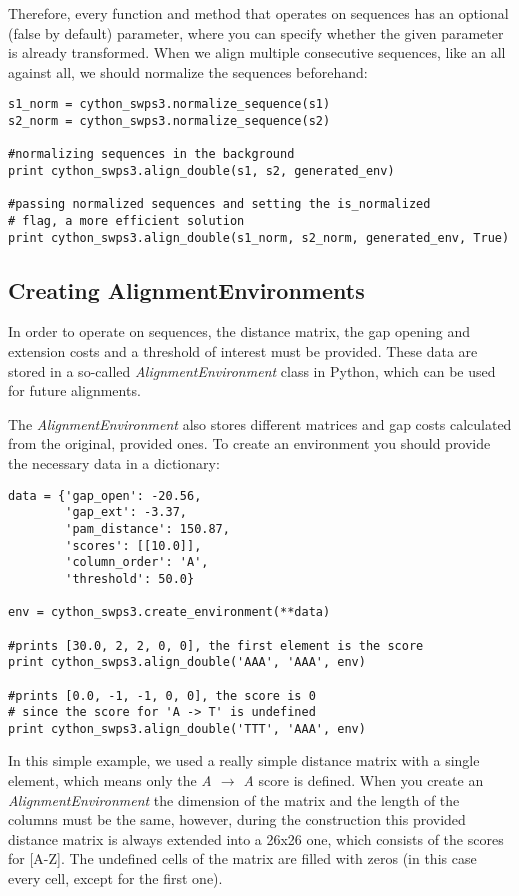 \documentclass[12pt]{article}
\newcommand{\alenv}{\emph{AlignmentEnvironment}}
\begin{document}
Therefore, every function and method that operates on sequences has an optional (false by default) parameter, where you can specify whether the given parameter is already transformed. When we align multiple consecutive sequences, like an all against all, we should normalize the sequences beforehand:

\begin{lstlisting}
s1_norm = cython_swps3.normalize_sequence(s1)
s2_norm = cython_swps3.normalize_sequence(s2)

#normalizing sequences in the background
print cython_swps3.align_double(s1, s2, generated_env)

#passing normalized sequences and setting the is_normalized
# flag, a more efficient solution
print cython_swps3.align_double(s1_norm, s2_norm, generated_env, True)
\end{lstlisting}


\subsection{Creating AlignmentEnvironments}
\label{subsec:createAlEnvs}
In order to operate on sequences, the distance matrix, the gap opening and extension costs and a threshold of interest must be provided. These data are stored in a so-called \alenv{} class in Python, which can be used for future alignments. 

The \alenv{} also stores different matrices and gap costs calculated from the original, provided ones. To create an environment you should provide the necessary data in a dictionary:

\begin{lstlisting}
data = {'gap_open': -20.56,
        'gap_ext': -3.37,
        'pam_distance': 150.87,
        'scores': [[10.0]],
        'column_order': 'A',
        'threshold': 50.0}

env = cython_swps3.create_environment(**data)

#prints [30.0, 2, 2, 0, 0], the first element is the score
print cython_swps3.align_double('AAA', 'AAA', env)

#prints [0.0, -1, -1, 0, 0], the score is 0
# since the score for 'A -> T' is undefined
print cython_swps3.align_double('TTT', 'AAA', env)
\end{lstlisting}

In this simple example, we used a really simple distance matrix with a single element, which means only the \emph{A $\rightarrow$ A} score is defined. When you create an \alenv{} the dimension of the matrix and the length of the columns must be the same, however, during the construction  this provided distance matrix is always extended into a 26x26 one, which consists of the scores for [A-Z]. The undefined cells of the matrix are filled with zeros (in this case every cell, except for the first one).
\end{document}
